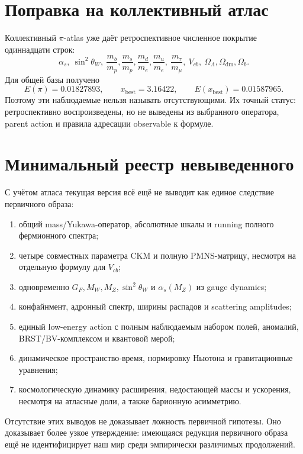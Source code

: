 \documentclass[12pt,a4paper]{article}
\begin{document}
\section{Поправка на коллективный атлас}

Коллективный \(\pi\)-atlas уже даёт ретроспективное численное покрытие
одиннадцати строк:
\begin{equation}
 \alpha_s,\ \sin^2\theta_W,\ 
 \frac{m_b}{m_p},\frac{m_s}{m_p},\frac{m_d}{m_e},\frac{m_u}{m_e},\
 \frac{m_\tau}{m_\mu},\ V_{cb},\
 \Omega_\Lambda,\Omega_{\mathrm{dm}},\Omega_b.
\end{equation}
Для общей базы получено
\begin{equation}
 E(\pi)=0.01827893,\qquad
 x_{\mathrm{best}}=3.16422,\qquad
 E(x_{\mathrm{best}})=0.01587965.
\end{equation}
Поэтому эти наблюдаемые нельзя называть отсутствующими. Их точный статус:
ретроспективно воспроизведены, но не выведены из выбранного оператора,
parent action и правила адресации observable к формуле.

\section{Минимальный реестр невыведенного}

С учётом атласа текущая версия всё ещё не выводит как единое следствие
первичного образа:
\begin{enumerate}
 \item общий mass/Yukawa-оператор, абсолютные шкалы и running полного
 фермионного спектра;
 \item четыре совместных параметра CKM и полную PMNS-матрицу, несмотря на
 отдельную формулу для \(V_{cb}\);
 \item одновременно \(G_F,M_W,M_Z,\sin^2\theta_W\) и \(\alpha_s(M_Z)\) из
 gauge dynamics;
 \item конфайнмент, адронный спектр, ширины распадов и scattering amplitudes;
 \item единый low-energy action с полным наблюдаемым набором полей,
 аномалий, BRST/BV-комплексом и квантовой мерой;
 \item динамическое пространство-время, нормировку Ньютона и гравитационные
 уравнения;
 \item космологическую динамику расширения, недостающей массы и ускорения,
 несмотря на атласные доли, а также барионную асимметрию.
\end{enumerate}

Отсутствие этих выводов не доказывает ложность первичной гипотезы. Оно
доказывает более узкое утверждение: имеющаяся редукция первичного образа ещё
не идентифицирует наш мир среди эмпирически различимых продолжений.
\end{document}
